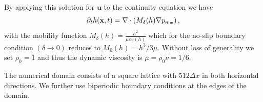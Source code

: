 \documentclass[twoside,twocolumn,9pt]{article}
\begin{document}
By applying this solution for $\mathbf{u}$ to the continuity equation we have
\begin{equation}\label{eq:thinsolve_app}
     \partial_t h(\mathbf{x},t) = \nabla\cdot\left(M_{\delta}(h)\nabla p_{\mbox{\tiny{film}}}\right),
\end{equation}
with the mobility function $M_{\delta}(h) = \frac{h^2}{\mu\alpha_{\delta}(h)}$ which for the no-slip boundary condition $(\delta \rightarrow 0)$ reduces to $M_{0}(h) = h^3/3\mu$.
Without loss of generality we set $\rho_0 = 1$ and thus the dynamic viscosity is $\mu = \rho_0 \nu = 1/6$. 

The numerical domain consists of a square lattice with $512\Delta x$ in both horizontal directions.
We further use biperiodic boundary conditions at the edges of the domain. 
\end{document}
